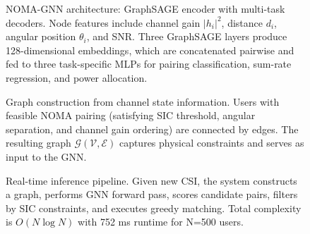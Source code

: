 


\begin{figure}[t]
\centering

\caption{NOMA-GNN architecture: GraphSAGE encoder with multi-task decoders. Node features include channel gain $|h_i|^2$, distance $d_i$, angular position $\theta_i$, and SNR. Three GraphSAGE layers produce 128-dimensional embeddings, which are concatenated pairwise and fed to three task-specific MLPs for pairing classification, sum-rate regression, and power allocation.}
\label{fig:gnn_architecture}
\end{figure}

\begin{figure}[t]
\centering

\caption{Graph construction from channel state information. Users with feasible NOMA pairing (satisfying SIC threshold, angular separation, and channel gain ordering) are connected by edges. The resulting graph $\mathcal{G}(\mathcal{V}, \mathcal{E})$ captures physical constraints and serves as input to the GNN.}
\label{fig:graph_construction}
\end{figure}

\begin{figure}[t]
\centering

\caption{Real-time inference pipeline. Given new CSI, the system constructs a graph, performs GNN forward pass, scores candidate pairs, filters by SIC constraints, and executes greedy matching. Total complexity is $O(N \log N)$ with 752 ms runtime for N=500 users.}
\label{fig:inference_pipeline}
\end{figure}

